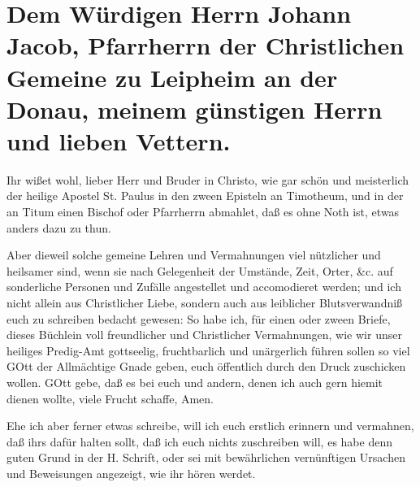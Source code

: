 \section*{Dem Würdigen Herrn Johann Jacob, Pfarrherrn der Christlichen Gemeine zu Leipheim an der Donau, meinem günstigen Herrn und lieben Vettern.}

Ihr wißet wohl, lieber Herr und Bruder in Christo, wie gar schön und meisterlich der heilige Apostel St. Paulus in den zween Episteln an Timotheum, und in der an Titum einen Bischof oder Pfarrherrn abmahlet, daß es ohne Noth ist, etwas anders dazu zu thun.

Aber dieweil solche gemeine Lehren und Vermahnungen viel nützlicher und heilsamer sind, wenn sie nach Gelegenheit der Umstände, Zeit, Orter, \&c. auf sonderliche Personen und Zufälle angestellet und accomodieret werden; und ich nicht allein aus Christlicher Liebe, sondern auch aus leiblicher Blutsverwandniß euch zu schreiben bedacht gewesen: So habe ich, für einen oder zween Briefe, dieses Büchlein voll freundlicher und Christlicher Vermahnungen, wie wir unser heiliges Predig-Amt gottseelig, fruchtbarlich und unärgerlich führen sollen so viel GOtt der Allmächtige Gnade geben, euch öffentlich durch den Druck zuschicken wollen. GOtt gebe, daß es bei euch und andern, denen ich auch gern hiemit dienen wollte, viele Frucht schaffe, Amen.

Ehe ich aber ferner etwas schreibe, will ich euch erstlich erinnern und vermahnen, daß ihrs dafür halten sollt, daß ich euch nichts zuschreiben will, es habe denn guten Grund in der H. Schrift, oder sei mit bewährlichen vernünftigen Ursachen und Beweisungen angezeigt, wie ihr hören werdet.

